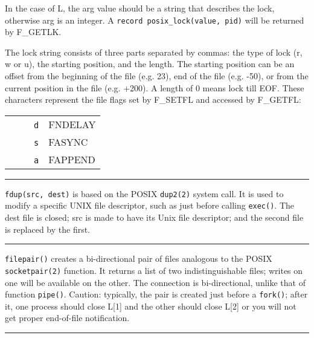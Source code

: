 In the case of L, the arg value should be a string that describes the
lock, otherwise arg is an integer. A \texttt{record posix\_lock(value,
pid)} will be returned by F\_GETLK.

The lock string consists of three parts separated by commas: the type of
lock (r, w or u), the starting position, and the length. The starting
position can be an offset from the beginning of the file (e.g. 23), end
of the file (e.g. -50), or from the current position in the file (e.g.
+200). A length of 0 means lock till EOF. These characters represent
the file flags set by F\_SETFL and accessed by F\_GETFL:

\begin{flushleft}
\begin{xtabular}{m{3.00cm}m{4.00cm}}
\ \ \ \ \ \texttt{d} & FNDELAY\\
\ \ \ \ \ \texttt{s} & FASYNC\\
\ \ \ \ \ \texttt{a} & FAPPEND\\
\end{xtabular}
\end{flushleft}

\bigskip\hrule\vspace{0.1cm}

\noindent
\texttt{fdup(src, dest)} is based on the POSIX \texttt{dup2(2)} system
call. It is used to
modify a specific UNIX file descriptor, such as just before calling
\texttt{exec()}. The dest file is closed; src is made to have its Unix file
descriptor; and the second file is replaced by the first.

\bigskip\hrule\vspace{0.1cm}

\noindent
\texttt{filepair()} creates a bi-directional pair of files
analogous to the POSIX \texttt{socketpair(2)} function. It returns a list of two
indistinguishable files; writes on one will be available on the other. The
connection is bi-directional, unlike that of function \texttt{pipe()}.
Caution: typically, the pair is
created just before a \texttt{fork()}; after it, one process should close L[1]
and the other should close L[2] or you will not get proper end-of-file
notification.

\bigskip\hrule\vspace{0.1cm}

